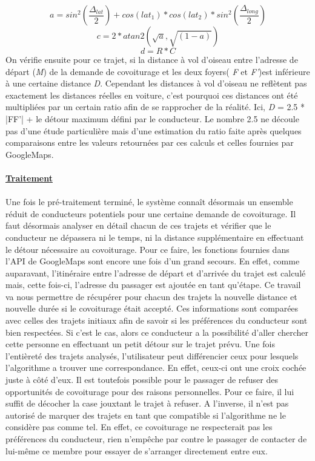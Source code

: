 \documentclass[12pt, a4paper, oneside]{article}
\begin{document}
    \begin{equation*}
        a = sin^{2}(\frac{\Delta_{lat}}{2}) + cos(lat_{1}) * cos(lat_{2}) * sin^{2}(\frac{\Delta_{long}}{2})
    \end{equation*}
     \begin{equation*}
         c = 2 * atan2(\sqrt{a},\sqrt{(1-a)})
     \end{equation*}
     \begin{equation*}
        d = R * C
     \end{equation*}     
     On vérifie ensuite pour ce trajet, si la distance à vol d'oiseau entre l'adresse de départ (\textit{M}) de la demande de covoiturage et les deux foyers( \textit{F} et \textit{F'})est inférieure à une certaine distance \textit{D}. Cependant les distances à vol d'oiseau ne reflètent pas exactement les distances réelles en voiture, c'est pourquoi ces distances ont été multipliées par un certain ratio afin de se rapprocher de la réalité. Ici, \textit{D} = 2.5 * |FF'| + le détour maximum défini par le conducteur. Le nombre 2.5 ne découle pas d'une étude particulière mais d'une estimation du ratio faite après quelques comparaisons entre les valeurs retournées par ces calculs et celles fournies par GoogleMaps.\\\\
     \underline{\textbf{Traitement}}\\\\
     \indent Une fois le pré-traitement terminé, le système connaît désormais un ensemble réduit de conducteurs potentiels pour une certaine demande de covoiturage. Il faut désormais analyser en détail chacun de ces trajets et vérifier que le conducteur ne dépassera ni le temps, ni la distance supplémentaire en effectuant le détour nécessaire au covoiturage. Pour ce faire, les fonctions fournies dans l'API de GoogleMaps sont encore une fois d'un grand secours. En effet, comme auparavant, l'itinéraire entre l'adresse de départ et d'arrivée du trajet est calculé mais, cette fois-ci, l'adresse du passager est ajoutée en tant qu'étape. Ce travail va nous permettre de récupérer pour chacun des trajets la nouvelle distance et nouvelle durée si le covoiturage était accepté. Ces informations sont comparées avec celles des trajets initiaux afin de savoir si les préférences du conducteur sont bien respectées. Si c'est le cas, alors ce conducteur a la possibilité d'aller chercher cette personne en effectuant un petit détour sur le trajet prévu. Une fois l'entièreté des trajets analysés, l'utilisateur peut différencier ceux pour lesquels l'algorithme a trouver une correspondance. En effet, ceux-ci ont une croix cochée juste à côté d'eux. Il est toutefois possible pour le passager de refuser des opportunités de covoiturage pour des raisons personnelles. Pour ce faire, il lui suffit de décocher la case jouxtant le trajet à refuser. A l'inverse, il n'est pas autorisé de marquer des trajets en tant que compatible si l'algorithme ne le considère pas comme tel. En effet, ce covoiturage ne respecterait pas les préférences du conducteur, rien n'empêche par contre le passager de contacter de lui-même ce membre pour essayer de s'arranger directement entre eux.\\\\
\end{document}
